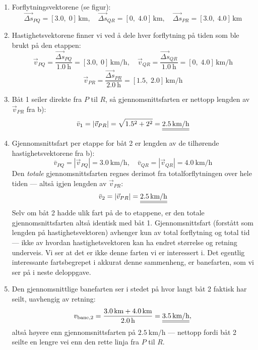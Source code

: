 {\begin{enumerate}[\textbf{\alph*)}]
    \item Forflytningsvektorene (se figur):
          \[\vec{\Delta s}_{PQ}=[3.0,\;0]\,\si{\kilo\metre},\quad
            \vec{\Delta s}_{QR}=[0,\;4.0]\,\si{\kilo\metre},\quad
            \vec{\Delta s}_{PR}=[3.0,\;4.0]\,\si{\kilo\metre}\]
    \item Hastighetsvektorene finner vi ved å dele hver forflytning på tiden som ble brukt på den etappen:
          \[\vec{v}_{PQ}=\frac{\vec{\Delta s}_{PQ}}{\SI{1.0}{\hour}}=[3.0,\;0]\,\si{\kilo\metre\per\hour},\quad
            \vec{v}_{QR}=\frac{\vec{\Delta s}_{QR}}{\SI{1.0}{\hour}}=[0,\;4.0]\,\si{\kilo\metre\per\hour}\]
          \[\vec{v}_{PR}=\frac{\vec{\Delta s}_{PR}}{\SI{2.0}{\hour}}=[1.5,\;2.0]\,\si{\kilo\metre\per\hour}\]
    \item Båt 1 seiler direkte fra $P$ til $R$, så gjennomsnittsfarten er nettopp lengden av $\vec{v}_{PR}$ fra b):
          \[\bar{v}_1=|\vec{v}_{PR}|=\sqrt{1.5^2+2^2}= \underline{\underline{2.5\,\text{km/h}}}\]
    \item Gjennomsnittsfart per etappe for båt 2 er lengden av de tilhørende hastighetsvektorene fra b):
          \[\bar{v}_{PQ}=|\vec{v}_{PQ}|=\SI{3.0}{\kilo\metre\per\hour},\quad\bar{v}_{QR}=|\vec{v}_{QR}|=\SI{4.0}{\kilo\metre\per\hour}\]
          Den \emph{totale} gjennomsnittsfarten regnes derimot fra totalforflytningen over hele tiden --- altså igjen lengden av $\vec{v}_{PR}$:
          \[\bar{v}_2=|\vec{v}_{PR}|= \underline{\underline{2.5\,\text{km/h}}}\]
          Selv om båt 2 hadde ulik fart på de to etappene, er den totale gjennomsnittsfarten altså identisk med båt 1. Gjennomsnittsfart (forstått som lengden på hastighetsvektoren) avhenger kun av total forflytning og total tid --- ikke av hvordan hastighetsvektoren kan ha endret størrelse og retning underveis. Vi ser at det er ikke denne farten vi er interessert i. Det egentlig interessante fartsbegrepet i akkurat denne sammenheng, er banefarten, som vi ser på i neste deloppgave.
    \item Den gjennomsnittlige banefarten ser i stedet på hvor langt båt 2 faktisk har seilt, uavhengig av retning:
          \[
          v_{\text{bane},2}=\frac{3.0\,\text{km}+4.0\,\text{km}}{2.0\,\text{h}}= \underline{\underline{3.5\,\text{km/h}}},
          \]
          altså høyere enn gjennomsnittsfarten på $\SI{2.5}{\kilo\metre\per\hour}$ --- nettopp fordi båt 2 seilte en lengre vei enn den rette linja fra $P$ til $R$. 
\end{enumerate}
}

